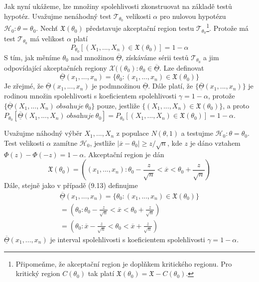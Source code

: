 Jak nyní ukážeme, lze množiny spolehlivosti zkonstruovat na základě testů hypotéz. Uvažujme nenáhodný test $\mathscr{T}_{\theta_0}$ velikosti $\alpha$ pro nulovou hypotézu $\mathscr{H}_0: \theta =  \theta_0$. Nechť $\mathfrak{X}(\theta_0)$ představuje akceptační region testu $\mathscr{T}_{\theta_0}$\footnote{Připomeňme, že akceptační region je doplňkem kritického regionu. Pro kritický region $C(\theta_0)$ tak platí $\mathfrak{X}(\theta_0) = \mathfrak{X} - C(\theta_0)$.}. Protože má test $\mathscr{T}_{\theta_0}$ má velikost $\alpha$ platí
\begin{equation*}
P_{\theta_0}[(X_1, ..., X_n) \in \mathfrak{X}(\theta_0)] = 1 - \alpha
\end{equation*}
S tím, jak měníme $\theta_0$ nad množinou $\overline{\underline{\Theta}}$, získáváme sérii testů $\mathscr{T}_{\theta_0}$ a jim odpovídající akceptačních regiony $\mathscr{X}((\theta_0): \theta_0 \in \overline{\underline{\Theta}}$. Lze definovat
\begin{equation}
\overline{\underline{\Theta}}(x_1, ..., x_n) = \{\theta_0: (x_1, ..., x_n) \in \mathfrak{X}(\theta_0)\}
\end{equation}
Je zřejmé, že $\overline{\underline{\Theta}}(x_1, ..., x_n)$ je podmnožinou $\overline{\underline{\Theta}}$. Dále platí, že $\{\overline{\underline{\Theta}}(x_1, ...,  x_n)\}$ je rodinou množin spolehlivosti s koeficientem spolehlivosti $\gamma = 1 - \alpha$, protože $\{\overline{\underline{\Theta}}(X_1, ..., X_n) ~ \textit{obsahuje} ~ \theta_0\}$ pouze, jestliže $\{(X_1, ..., X_n) \in \mathfrak{X}(\theta_0)\}$, a proto $P_{\theta_0}[\overline{\underline{\Theta}}(X_1, ..., X_n) ~ \textit{obsahuje} ~ \theta_0] = P_{\theta_0}[(X_1, ..., X_n) \in \mathfrak{X}(\theta_0)] = 1 - \alpha$.

\begin{example}
Uvažujme náhodný výběr $X_1, ..., X_n$ z populace $N(\theta, 1)$ a testujme $\mathscr{H_0}: \theta = \theta_0$. Test velikosti $\alpha$ zamítne $\mathscr{H}_0$, jestliže $|\overline{x} - \theta_0| \ge z / \sqrt{n}$, kde $z$ je dáno vztahem $\Phi(z) - \Phi(-z) = 1 - \alpha$. Akceptační region je dán
\begin{equation*}
\mathfrak{X}(\theta_0) = \left((x_1, ..., x_n): \theta_0 - \frac{z}{\sqrt{n}} < \overline{x} < \theta_0 + \frac{z}{\sqrt{n}} \right)
\end{equation*}
Dále, stejně jako v případě (9.13) definujme
\begin{multline*}
\overline{\underline{\Theta}}(x_1, ..., x_n) = \{\theta_0: (x_1, ..., x_n) \in \mathfrak{X}(\theta_0)\}\\
= \left(\theta_0: \theta_0 - \frac{z}{\sqrt{n}} < \overline{x} < \theta_0 + \frac{z}{\sqrt{n}}\right)\\
= \left(\theta_0: \overline{x} - \frac{z}{\sqrt{n}} < \theta_0 < \overline{x} + \frac{z}{\sqrt{n}}\right)
\end{multline*}
$\overline{\underline{\Theta}}(x_1, ..., x_n)$ je interval spolehlivosti s koeficientem spolehlivosti $\gamma = 1 - \alpha$.
\end{example}

